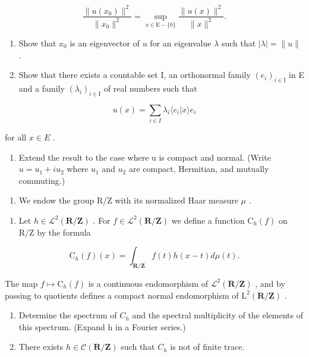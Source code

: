 \[
\frac {\| u (x _ {0}) \| ^ {2}}{\| x _ {0} \| ^ {2}} = \sup _ {x \in \mathrm{E} - \{0 \}} \frac {\| u (x) \| ^ {2}}{\| x \| ^ {2}}.
\]

\begin{enumerate}
\def\labelenumi{\alph{enumi})}
\setcounter{enumi}{2}
\item
  Show that \(x_{0}\) is an eigenvector of \(u\) for an eigenvalue \(\lambda\) such that \(|\lambda| = \|u\|\) .
\item
  Show that there exists a countable set I, an orthonormal family \((e_{i})_{i\in\mathrm{I}}\) in E and a family \((\lambda_{i})_{i\in\mathrm{I}}\) of real numbers such that
\end{enumerate}

\[
u (x) = \sum_ {i \in I} \lambda_ {i} \langle e _ {i} | x \rangle e _ {i}
\]

for all \(x \in E\) .

\begin{enumerate}
\def\labelenumi{\alph{enumi})}
\setcounter{enumi}{4}
\tightlist
\item
  Extend the result to the case where u is compact and normal. (Write \(u = u_{1} + iu_{2}\) where \(u_{1}\) and \(u_{2}\) are compact, Hermitian, and mutually commuting.)
\end{enumerate}

\begin{enumerate}
\def\labelenumi{\arabic{enumi})}
\setcounter{enumi}{7}
\tightlist
\item
  We endow the group R/Z with its normalized Haar measure \(\mu\) .
\end{enumerate}

\begin{enumerate}
\def\labelenumi{\alph{enumi})}
\tightlist
\item
  Let \(h \in \mathcal{L}^{2}(\mathbf{R}/\mathbf{Z})\) . For \(f \in \mathcal{L}^{2}(\mathbf{R}/\mathbf{Z})\) we define a function \(\mathrm{C}_{h}(f)\) on R/Z by the formula
\end{enumerate}

\[
\mathrm{C} _ {h} (f) (x) = \int_ {\mathbf {R} / \mathbf {Z}} f (t) h (x - t) d \mu (t).
\]

The map \(f \mapsto \mathrm{C}_h(f)\) is a continuous endomorphism of \(\mathcal{L}^2(\mathbf{R}/\mathbf{Z})\) , and by passing to quotients defines a compact normal endomorphism of \(\mathrm{L}^2(\mathbf{R}/\mathbf{Z})\) .

\begin{enumerate}
\def\labelenumi{\alph{enumi})}
\setcounter{enumi}{1}
\item
  Determine the spectrum of \(C_{h}\) and the spectral multiplicity of the elements of this spectrum. (Expand h in a Fourier series.)
\item
  There exists \(h \in \mathcal{C}(\mathbf{R}/\mathbf{Z})\) such that \(C_{h}\) is not of finite trace.
\end{enumerate}


